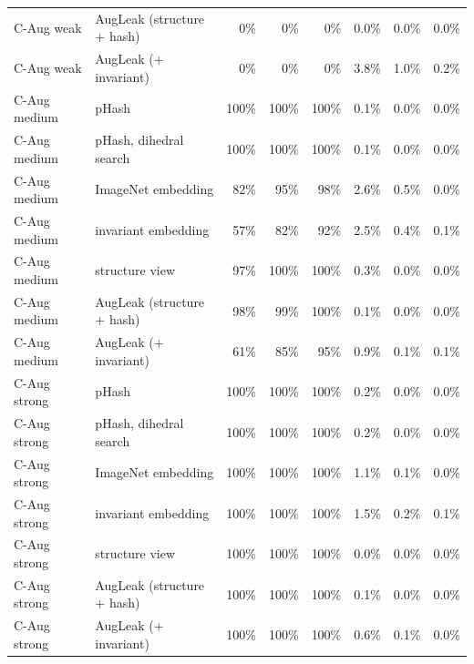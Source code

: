 \begin{table}[h]
\begin{tabular}{@{}llrrrrrr@{}}
C-Aug weak & AugLeak (structure + hash) & 0\% & 0\% & 0\% & 0.0\% & 0.0\% & 0.0\% \\
C-Aug weak & AugLeak (+ invariant) & 0\% & 0\% & 0\% & 3.8\% & 1.0\% & 0.2\% \\
C-Aug medium & pHash & 100\% & 100\% & 100\% & 0.1\% & 0.0\% & 0.0\% \\
C-Aug medium & pHash, dihedral search & 100\% & 100\% & 100\% & 0.1\% & 0.0\% & 0.0\% \\
C-Aug medium & ImageNet embedding & 82\% & 95\% & 98\% & 2.6\% & 0.5\% & 0.0\% \\
C-Aug medium & invariant embedding & 57\% & 82\% & 92\% & 2.5\% & 0.4\% & 0.1\% \\
C-Aug medium & structure view & 97\% & 100\% & 100\% & 0.3\% & 0.0\% & 0.0\% \\
C-Aug medium & AugLeak (structure + hash) & 98\% & 99\% & 100\% & 0.1\% & 0.0\% & 0.0\% \\
C-Aug medium & AugLeak (+ invariant) & 61\% & 85\% & 95\% & 0.9\% & 0.1\% & 0.1\% \\
C-Aug strong & pHash & 100\% & 100\% & 100\% & 0.2\% & 0.0\% & 0.0\% \\
C-Aug strong & pHash, dihedral search & 100\% & 100\% & 100\% & 0.2\% & 0.0\% & 0.0\% \\
C-Aug strong & ImageNet embedding & 100\% & 100\% & 100\% & 1.1\% & 0.1\% & 0.0\% \\
C-Aug strong & invariant embedding & 100\% & 100\% & 100\% & 1.5\% & 0.2\% & 0.1\% \\
C-Aug strong & structure view & 100\% & 100\% & 100\% & 0.0\% & 0.0\% & 0.0\% \\
C-Aug strong & AugLeak (structure + hash) & 100\% & 100\% & 100\% & 0.1\% & 0.0\% & 0.0\% \\
C-Aug strong & AugLeak (+ invariant) & 100\% & 100\% & 100\% & 0.6\% & 0.1\% & 0.0\% \\
\bottomrule
\end{tabular}
\end{table}
